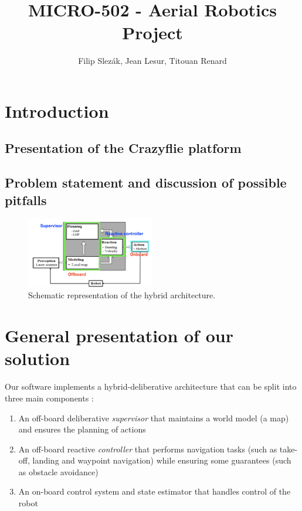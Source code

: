 \documentclass[11pt]{article}
\title{MICRO-502 - Aerial Robotics Project}
\author{Filip Slezák, Jean Lesur, Titouan Renard}
\begin{document}
\maketitle

\section{Introduction}

\subsection{Presentation of the Crazyflie platform}

\subsection{Problem statement and discussion of possible pitfalls}

\begin{figure}[h!]
    \centering
    \includegraphics[width=0.5\textwidth]{figures/arch_provisoire.png}
    \caption{Schematic representation of the hybrid architecture.}
\end{figure}


\section{General presentation of our solution}

Our software implements a hybrid-deliberative architecture that can be split into three main components :
\begin{enumerate}
    \item An off-board deliberative \textit{supervisor} that maintains a world model (a map) and ensures the planning of actions
    \item An off-board reactive \textit{controller} that performs navigation tasks (such as take-off, landing and waypoint navigation) while ensuring some guarantees (such as obstacle avoidance)
    \item An on-board control system and state estimator that handles control of the robot
\end{enumerate}
\end{document}
